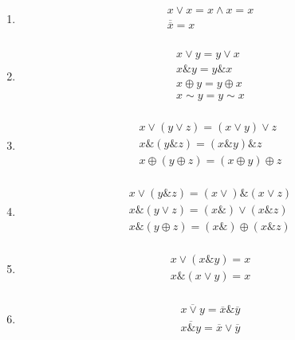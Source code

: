 \begin{remark}
    \begin{multicols}{2}
        \begin{enumerate}
            \item \begin{gather*}
                x \vee x = x \wedge x = x \\
                \overline{\overline{x}} = x \\
            \end{gather*}
            \item \begin{gather*}
                x \vee y = y \vee x \\
                x \& y = y \& x \\
                x \oplus y = y \oplus x \\
                x \sim y = y \sim x \\
            \end{gather*}
            \item \begin{gather*}
                x \vee (y \vee z) = (x \vee y) \vee z \\
                x \& (y \& z) = (x \& y) \& z \\
                x \oplus (y \oplus z) = (x \oplus y) \oplus z \\
            \end{gather*}
            \item \begin{gather*}
                x \vee (y \& z) = (x \vee ) \& (x \vee z) \\
                x \& (y \vee z) = (x \& ) \vee (x \& z) \\
                x \& (y \oplus z) = (x \& ) \oplus (x \& z) \\
            \end{gather*}
            \item \begin{gather*}
                x \vee (x \& y) = x \\ 
                x \& (x \vee y) = x \\ 
            \end{gather*}
            \item \begin{gather*}
                \overline{x \vee y} = \overline{x} \& \overline{y} \\
                \overline{x \& y} = \overline{x} \vee \overline{y} \\

\end{gather*}
\end{enumerate}
\end{multicols}
\end{remark}
